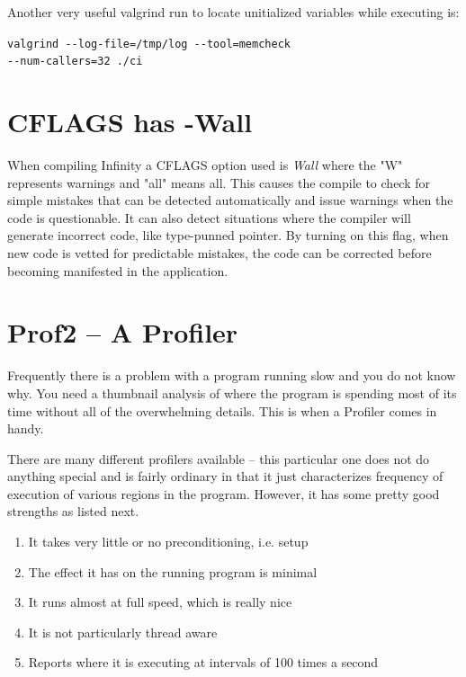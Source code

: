 Another very useful valgrind run to locate unitialized variables while executing is:

\hspace{2em}\texttt{valgrind -{}-log-file=/tmp/log -{}-tool=memcheck\\
	-{}-num-callers=32 ./ci}

\section{CFLAGS has -Wall}
\label{sec:cflags_has_-wall}
When compiling \CGG{} Infinity a CFLAGS option used is \textit{Wall} where the "W" represents warnings and "all" means all.  This causes the compile to check for simple mistakes that can be detected automatically and issue warnings when the code is questionable.  It can also detect situations where the compiler will generate incorrect code, like type-punned pointer.  By turning on this flag, when new code is vetted for predictable mistakes, the code can be corrected before becoming manifested in the application.

\section{Prof2 -- A Profiler}
\label{sec:prof2_profiler}

Frequently there is a problem with a program running slow and you do not know why. You need a thumbnail analysis of where the program is spending most of its time without all of the overwhelming details. This is when a Profiler comes in handy.

There are many different profilers available -- this particular one does not do anything special and is fairly ordinary in that it just characterizes frequency of execution of various regions in the program. However, it has some pretty good strengths as listed next.

\begin{enumerate}[nosep]
	\item It takes very little or no preconditioning, i.e. setup
	\item The effect it has on the running program is minimal
	\item It runs almost at full speed, which is really nice
	\item It is not particularly thread aware
	\item Reports where it is executing at intervals of 100 times a second
\end{enumerate}

